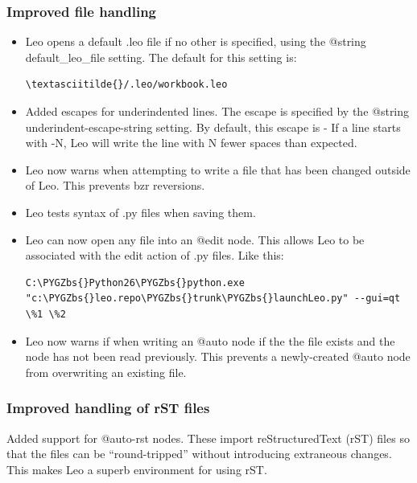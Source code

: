 \documentclass[a4paper,10pt,english]{sphinxmanual}
\def\PYGZbs{\char`\\}
\begin{document}
\subsubsection{Improved file handling}
\label{what-is-new:id4}\begin{itemize}
\item {} 
Leo opens a default .leo file if no other is specified, using the @string
default\_leo\_file setting. The default for this setting is:

\begin{Verbatim}[commandchars=\\\{\}]
\textasciitilde{}/.leo/workbook.leo
\end{Verbatim}

\item {} 
Added escapes for underindented lines. The escape is specified by the @string
underindent-escape-string setting. By default, this escape is - If a line
starts with -N, Leo will write the line with N fewer spaces than expected.

\item {} 
Leo now warns when attempting to write a file that has been changed outside of
Leo. This prevents bzr reversions.

\item {} 
Leo tests syntax of .py files when saving them.

\item {} 
Leo can now open any file into an @edit node. This allows Leo to be associated
with the edit action of .py files. Like this:

\begin{Verbatim}[commandchars=\\\{\}]
C:\PYGZbs{}Python26\PYGZbs{}python.exe "c:\PYGZbs{}leo.repo\PYGZbs{}trunk\PYGZbs{}launchLeo.py" --gui=qt \%1 \%2
\end{Verbatim}

\item {} 
Leo now warns if when writing an @auto node if the the file exists and the
node has not been read previously.  This prevents a newly-created
@auto node from overwriting an existing file.

\end{itemize}


\subsubsection{Improved handling of rST files}
\label{what-is-new:improved-handling-of-rst-files}
Added support for @auto-rst nodes. These import reStructuredText (rST) files
so that the files can be ``round-tripped'' without introducing extraneous changes.
This makes Leo a superb environment for using rST.
\end{document}
